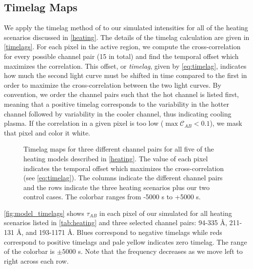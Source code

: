\subsection{Timelag Maps}\label{timelag_maps}

We apply the timelag method of \citet{viall_evidence_2012} to our simulated intensities for all of the heating scenarios discussed in \autoref{heating}. The details of the timelag calculation are given in \autoref{timelags}. For each pixel in the active region, we compute the cross-correlation for every possible channel pair (15 in total) and find the temporal offset which maximizes the correlation. This offset, or \textit{timelag}, given by \autoref{eq:timelag}, indicates how much the second light curve must be shifted in time compared to the first in order to maximize the cross-correlation between the two light curves. By convention, we order the channel pairs such that the hot channel is listed first, meaning that a positive timelag corresponds to the variability in the hotter channel followed by variability in the cooler channel, thus indicating cooling plasma. If the correlation in a given pixel is too low ($\max{\mathcal{C}_{AB}}<0.1$), we mask that pixel and color it white. 

\begin{figure*}
    \caption{Timelag maps for three different channel pairs for all five of the heating models described in \autoref{heating}. The value of each pixel indicates the temporal offset which maximizes the cross-correlation (see \autoref{eq:timelag}). The columns indicate the different channel pairs and the rows indicate the three heating scenarios plus our two control cases. The colorbar ranges from -5000 s to +5000 s.}
    \label{fig:model_timelags}
\end{figure*}

\autoref{fig:model_timelags} shows $\tau_{AB}$ in each pixel of our simulated \AR{} for all heating scenarios listed in \autoref{tab:heating} and three selected channel pairs: 94-335 \AA{}, 211-131 \AA{}, and 193-1171 \AA{}. Blues correspond to negative timelags while reds correspond to positive timelags and pale yellow indicates zero timelag. The range of the colorbar is $\pm5000$ s. Note that the frequency decreases as we move left to right across each row.

